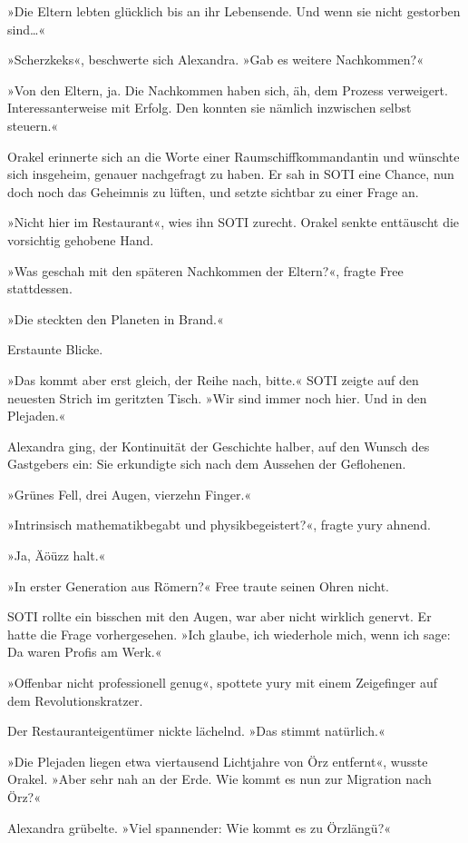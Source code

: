»Die Eltern lebten glücklich bis an ihr Lebensende. Und wenn sie nicht gestorben sind…«

»Scherzkeks«, beschwerte sich Alexandra. »Gab es weitere Nachkommen?«

»Von den Eltern, ja. Die Nachkommen haben sich, äh, dem Prozess verweigert. Interessanterweise mit Erfolg. Den konnten sie nämlich inzwischen selbst steuern.«

Orakel erinnerte sich an die Worte einer Raumschiffkommandantin und wünschte sich insgeheim, genauer nachgefragt zu haben. Er sah in SOTI eine Chance, nun doch noch das Geheimnis zu lüften, und setzte sichtbar zu einer Frage an.

»Nicht hier im Restaurant«, wies ihn SOTI zurecht. Orakel senkte enttäuscht die vorsichtig gehobene Hand.

»Was geschah mit den späteren Nachkommen der Eltern?«, fragte Free stattdessen.

»Die steckten den Planeten in Brand.«

Erstaunte Blicke.

»Das kommt aber erst gleich, der Reihe nach, bitte.« SOTI zeigte auf den neuesten Strich im geritzten Tisch. »Wir sind immer noch hier. Und in den Plejaden.«

Alexandra ging, der Kontinuität der Geschichte halber, auf den Wunsch des Gastgebers ein: Sie erkundigte sich nach dem Aussehen der Geflohenen.

»Grünes Fell, drei Augen, vierzehn Finger.«

»Intrinsisch mathematikbegabt und physikbegeistert?«, fragte yury ahnend.

»Ja, Äöüzz halt.«

»In erster Generation aus Römern?« Free traute seinen Ohren nicht.

SOTI rollte ein bisschen mit den Augen, war aber nicht wirklich genervt. Er hatte die Frage vorhergesehen. »Ich glaube, ich wiederhole mich, wenn ich sage: Da waren Profis am Werk.«

»Offenbar nicht professionell genug«, spottete yury mit einem Zeigefinger auf dem Revolutionskratzer.

Der Restauranteigentümer nickte lächelnd. »Das stimmt natürlich.«

»Die Plejaden liegen etwa viertausend Lichtjahre von Örz entfernt«, wusste Orakel. »Aber sehr nah an der Erde. Wie kommt es nun zur Migration nach Örz?«

Alexandra grübelte. »Viel spannender: Wie kommt es zu Örzlängü?«

